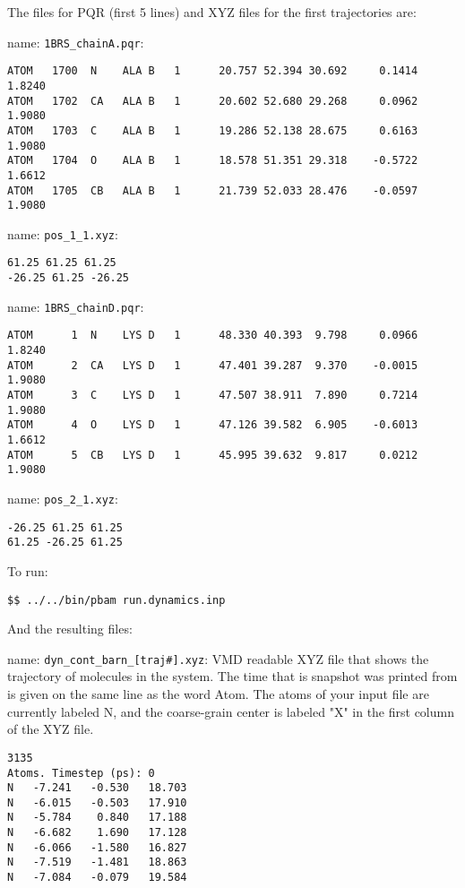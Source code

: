 The files for PQR (first 5 lines) and XYZ files for the first trajectories are: 

name:  \texttt{1BRS\_chainA.pqr}:
\begin{lstlisting}[style = MyBash]
ATOM   1700  N    ALA B   1      20.757 52.394 30.692     0.1414  1.8240
ATOM   1702  CA   ALA B   1      20.602 52.680 29.268     0.0962  1.9080
ATOM   1703  C    ALA B   1      19.286 52.138 28.675     0.6163  1.9080
ATOM   1704  O    ALA B   1      18.578 51.351 29.318    -0.5722  1.6612
ATOM   1705  CB   ALA B   1      21.739 52.033 28.476    -0.0597  1.9080
\end{lstlisting}

\medskip

name:  \texttt{pos\_1\_1.xyz}:
\begin{lstlisting}[style = MyBash]
61.25 61.25 61.25
-26.25 61.25 -26.25
\end{lstlisting}
\medskip

name:  \texttt{1BRS\_chainD.pqr}:
\begin{lstlisting}[style = MyBash]
ATOM      1  N    LYS D   1      48.330 40.393  9.798     0.0966  1.8240
ATOM      2  CA   LYS D   1      47.401 39.287  9.370    -0.0015  1.9080
ATOM      3  C    LYS D   1      47.507 38.911  7.890     0.7214  1.9080
ATOM      4  O    LYS D   1      47.126 39.582  6.905    -0.6013  1.6612
ATOM      5  CB   LYS D   1      45.995 39.632  9.817     0.0212  1.9080
\end{lstlisting}

\medskip

name:  \texttt{pos\_2\_1.xyz}:
\begin{lstlisting}[style = MyBash]
-26.25 61.25 61.25
61.25 -26.25 61.25
\end{lstlisting}
\medskip

To run: 
\begin{lstlisting}[style = MyBash]
$$ ../../bin/pbam run.dynamics.inp
\end{lstlisting}
\medskip

And the resulting files: 

name: \texttt{dyn\_cont\_barn\_[traj\#].xyz}: VMD readable XYZ file that shows the trajectory of molecules in the system. The time that is snapshot was printed from is given on the same line as the word Atom. The atoms of your input file are currently labeled N, and the coarse-grain center is labeled "X" in the first column of the XYZ file.

\begin{lstlisting}[style = MyBash]
3135
Atoms. Timestep (ps): 0
N   -7.241   -0.530   18.703
N   -6.015   -0.503   17.910
N   -5.784    0.840   17.188
N   -6.682    1.690   17.128
N   -6.066   -1.580   16.827
N   -7.519   -1.481   18.863
N   -7.084   -0.079   19.584
\end{lstlisting}
\medskip


